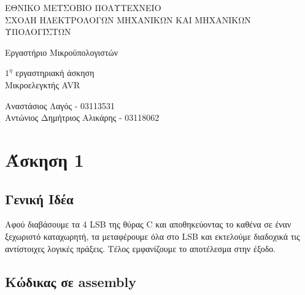 \documentclass[11pt]{article}
\begin{document}
\begin{titlepage}
	\begin{center}
		{ 
			ΕΘΝΙΚΟ ΜΕΤΣΟΒΙΟ ΠΟΛΥΤΕΧΝΕΙΟ\\
			ΣΧΟΛΗ ΗΛΕΚΤΡΟΛΟΓΩΝ ΜΗΧΑΝΙΚΩΝ ΚΑΙ ΜΗΧΑΝΙΚΩΝ ΥΠΟΛΟΓΙΣΤΩΝ
		}
		
		\vfill

		{\Large
			Εργαστήριο Μικροϋπολογιστών
		}
		
		{\large
			$1^η$ εργαστηριακή άσκηση \\ Μικροελεγκτής AVR 
		}

		\vfill

		{
			Αναστάσιος Λαγός - 03113531\\
			Αντώνιος Δημήτριος Αλικάρης - 03118062
		}
	\end{center}
\end{titlepage}


\section*{Άσκηση 1}

\subsection*{Γενική Ιδέα}

Αφού διαβάσουμε τα 4 LSB της θύρας C και αποθηκεύοντας το καθένα σε έναν ξεχωριστό καταχωρητή, τα μεταφέρουμε όλα στο LSB και εκτελούμε διαδοχικά τις αντίστοιχες λογικές πράξεις. Τέλος εμφανίζουμε το αποτέλεσμα στην έξοδο.

\subsection*{Κώδικας σε assembly}
\end{document}
